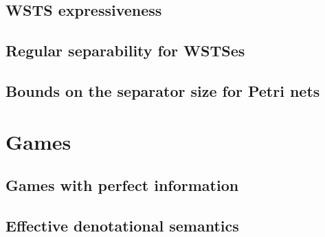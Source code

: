 \documentclass%
[%
    a4paper,                 %
    11pt,                    %
    parskip=half-,           %
    numbers=noenddot,        %
    twoside,                 %
    fleqn,                   %
    toc=chapterentrywithdots,%
    cleardoublepage=plain,   %
]
{style/smbook}
\begin{document}
    \chapter{WSTS expressiveness}%
    \label{Chapter:WSTSExpressiveness}%
    \chaptertoc%
        
        
        \clearpage
        

    \chapter{Regular separability for WSTSes}%
    \label{Chapter:WSTSSeparability}%
    \chaptertoc%
        
        
        \clearpage
        
        \clearpage
        

     \chapter{Bounds on the separator size for Petri nets}%
     \label{Chapter:WSTSSeparatorSize}%
     \chaptertoc%
        
        
        \clearpage
        


\part{Games}%
\label{Part:Games}%

    

    \chapter{Games with perfect information}%
    \label{Chapter:Games}%
        

    \chapter{Effective denotational semantics}%
    \label{Chapter:EDS}%
    \chaptertoc%
        
        \clearpage
        
        \clearpage
        
        \clearpage
        
\end{document}
